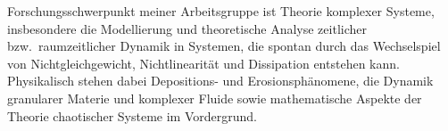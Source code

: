 \begin{multicols}{2}
Forschungsschwerpunkt meiner Arbeitsgruppe ist Theorie komplexer Systeme, insbesondere die Modellierung und theoretische Analyse zeitlicher bzw.\ raumzeitlicher Dynamik in Systemen, die spontan durch das Wechselspiel von Nichtgleichgewicht, Nichtlinearität und Dissipation entstehen kann. Physikalisch stehen dabei Depositions- und Erosionsphänomene, die Dynamik granularer Materie und komplexer Fluide sowie mathematische Aspekte der Theorie chaotischer Systeme im Vordergrund.

\end{multicols}

\begin{center}
\end{center}

\newpage

